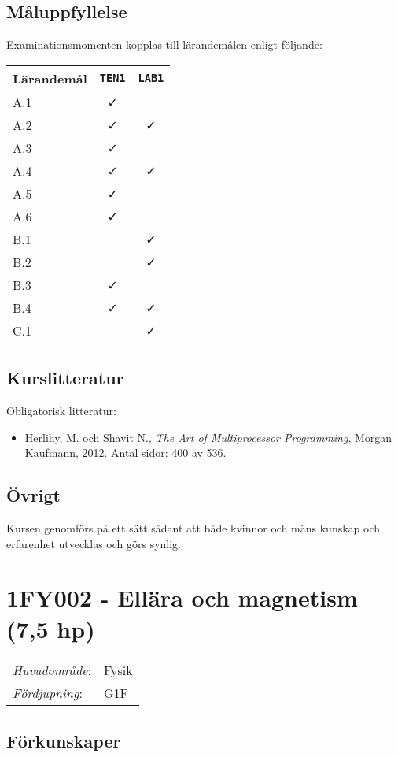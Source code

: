 \subsection*{Måluppfyllelse}

Examinationsmomenten kopplas till lärandemålen enligt följande:

\begin{longtable}[]{@{}lcc@{}}
\toprule
\textsf{Lärandemål} & \texttt{TEN1} & \texttt{LAB1}\tabularnewline
\midrule
\endhead
A.1 & \faCheck &\tabularnewline
A.2 & \faCheck & \faCheck\tabularnewline
A.3 & \faCheck &\tabularnewline
A.4 & \faCheck & \faCheck\tabularnewline
A.5 & \faCheck &\tabularnewline
A.6 & \faCheck &\tabularnewline
B.1 & & \faCheck\tabularnewline
B.2 & & \faCheck\tabularnewline
B.3 & \faCheck &\tabularnewline
B.4 & \faCheck & \faCheck\tabularnewline
C.1 & & \faCheck\tabularnewline
\bottomrule
\end{longtable}

\subsection*{Kurslitteratur}

Obligatorisk litteratur:

\begin{itemize}
\tightlist
\item
  Herlihy, M. och Shavit N., \emph{The Art of Multiprocessor
  Programming}, Morgan Kaufmann, 2012. Antal sidor: 400 av 536.
\end{itemize}

\subsection*{Övrigt}

Kursen genomförs på ett sätt sådant att både kvinnor och mäns kunskap och erfarenhet utvecklas och görs synlig.
\pagebreak
\section*{1FY002 - Ellära och magnetism (7,5 hp)}

\begin{tabular}{ll}\emph{Huvudområde}: & Fysik\tabularnewline\emph{Fördjupning}: & G1F\tabularnewline\end{tabular}

\subsection*{Förkunskaper}

